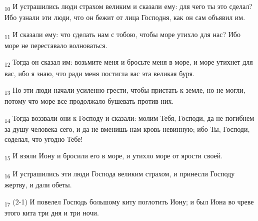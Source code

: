 \begin{tcolorbox}
\textsubscript{10} И устрашились люди страхом великим и сказали ему: для чего ты это сделал? Ибо узнали эти люди, что он бежит от лица Господня, как он сам объявил им.
\end{tcolorbox}
\begin{tcolorbox}
\textsubscript{11} И сказали ему: что сделать нам с тобою, чтобы море утихло для нас? Ибо море не переставало волноваться.
\end{tcolorbox}
\begin{tcolorbox}
\textsubscript{12} Тогда он сказал им: возьмите меня и бросьте меня в море, и море утихнет для вас, ибо я знаю, что ради меня постигла вас эта великая буря.
\end{tcolorbox}
\begin{tcolorbox}
\textsubscript{13} Но эти люди начали усиленно грести, чтобы пристать к земле, но не могли, потому что море все продолжало бушевать против них.
\end{tcolorbox}
\begin{tcolorbox}
\textsubscript{14} Тогда воззвали они к Господу и сказали: молим Тебя, Господи, да не погибнем за душу человека сего, и да не вменишь нам кровь невинную; ибо Ты, Господи, соделал, что угодно Тебе!
\end{tcolorbox}
\begin{tcolorbox}
\textsubscript{15} И взяли Иону и бросили его в море, и утихло море от ярости своей.
\end{tcolorbox}
\begin{tcolorbox}
\textsubscript{16} И устрашились эти люди Господа великим страхом, и принесли Господу жертву, и дали обеты.
\end{tcolorbox}
\begin{tcolorbox}
\textsubscript{17} (2-1) И повелел Господь большому киту поглотить Иону; и был Иона во чреве этого кита три дня и три ночи.
\end{tcolorbox}

